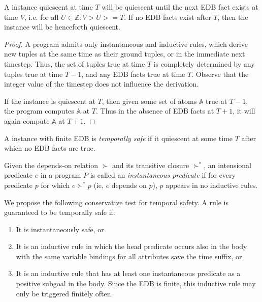 \begin{observation}
%
A \slang instance quiescent at time $T$ will be quiescent until the next EDB
fact exists at time $V$, i.e. for all $U \in \mathbb{Z}: V > U >= T$.  If no
EDB facts exist after $T$, then the instance will be henceforth quiescent.
%
\end{observation}
%
\begin{proof}
%
A \slang program admits only instantaneous and inductive rules, which derive new
tuples at the same time as their ground tuples, or in the immediate next
timestep.  Thus, the set of tuples true at time $T$ is completely determined by
any tuples true at time $T-1$, and any EDB facts true at time $T$.  Observe
that the integer value of the timestep does not influence the derivation.

If the instance is quiescent at $T$, then given some set of atoms $\mathbb{A}$
true at $T-1$, the program computes $\mathbb{A}$ at $T$.  Thus in the absence
of EDB facts at $T+1$, it will again compute $\mathbb{A}$ at $T+1$.
%
\end{proof}

\begin{definition}
%
A \slang instance with finite EDB is \emph{temporally safe} if it quiescent at
some time $T$ after which no EDB facts are true.
%
\end{definition}

\begin{definition}
%
Given the depends-on relation $\succ$ and its transitive closure $\succ^{*}$,
an intensional predicate $e$ in a program $P$ is called an \emph{instantaneous
predicate} if for every predicate $p$ for which $e \succ^{*} p$ (ie, $e$ depends on $p$), $p$ appears in
no inductive rules.

\end{definition}

We propose the following conservative test for temporal safety.  A rule is
guaranteed to be temporally safe if:

\begin{enumerate}
%
\item It is instantaneously safe, or
%
\item It is an inductive rule in which the head predicate occurs also in the
body with the same variable bindings for all attributes save the time suffix,
or
%
\item It is an inductive rule that has at least one instantaneous predicate as a
positive subgoal in the body.  Since the EDB is finite, this inductive rule
may only be triggered finitely often.
%
\end{enumerate}

